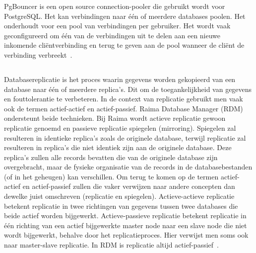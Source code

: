 PgBouncer is een open source connection-pooler die gebruikt wordt voor PostgreSQL. Het kan verbindingen naar één of meerdere databases poolen. Het onderhoudt voor een pool van verbindingen per gebruiker. Het wordt vaak geconfigureerd om één van de verbindingen uit te delen aan een nieuwe inkomende cliëntverbinding en terug te geven aan de pool wanneer de cliënt de verbinding verbreekt~\autocite{Ramachandran2019}.

\subsection{}
\label{subsec:Raima}

Databasereplicatie is het proces waarin gegevens worden gekopieerd van een database naar één of meerdere replica's. Dit om de toegankelijkheid van gegevens en fouttolerantie te verbeteren.
In de context van replicatie gebruikt men vaak ook de termen actief-actief en actief-passief. Raima Database Manager (RDM) ondersteunt beide technieken. Bij Raima wordt actieve replicatie gewoon replicatie genoemd en passieve replicatie spiegelen (mirroring). Spiegelen zal resulteren in identieke replica's zoals de originele database, terwijl replicatie zal resulteren in replica's die niet identiek zijn aan de originele database. Deze replica's zullen alle records bevatten die van de originele database zijn overgebracht, maar de fysieke organisatie van de records in de databasebestanden (of in het geheugen) kan verschillen.
Om terug te komen op de termen actief-actief en actief-passief zullen die vaker verwijzen naar andere concepten dan dewelke juist omschreven (replicatie en spiegelen). Actieve-actieve replicatie betekent replicatie in twee richtingen van gegevens tussen twee databases die beide actief worden bijgewerkt. Actieve-passieve replicatie betekent replicatie in één richting van een actief bijgewerkte master node naar een slave node die niet wordt bijgewerkt, behalve door het replicatieproces. Hier verwijst men soms ook naar master-slave replicatie. In RDM is replicatie altijd actief-passief~\autocite{Raima2021}. %

\subsection{}
\label{subsec:EDB}


